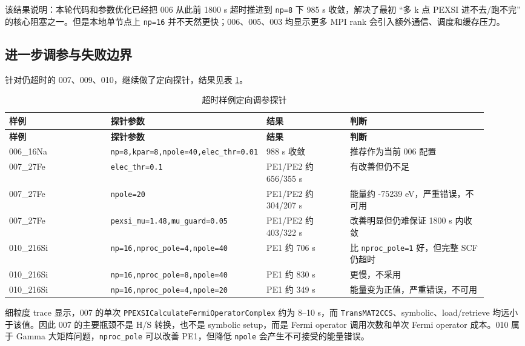 \documentclass[a4paper,11pt]{article}
\newcommand{\code}[1]{\texttt{#1}}
\begin{document}
该结果说明：本轮代码和参数优化已经把 006 从此前 1800 s 超时推进到 \code{np=8} 下 985 s 收敛，解决了最初 ``多 k 点 PEXSI 进不去/跑不完'' 的核心阻塞之一。但是本地单节点上 \code{np=16} 并不天然更快；006、005、003 均显示更多 MPI rank 会引入额外通信、调度和缓存压力。

\subsection{进一步调参与失败边界}

针对仍超时的 007、009、010，继续做了定向探针，结果见表 \ref{tab:timeout-tuning}。

{\scriptsize
\begin{longtable}{@{}p{0.22\linewidth}p{0.22\linewidth}p{0.18\linewidth}p{0.30\linewidth}@{}}
\caption{超时样例定向调参探针}
\label{tab:timeout-tuning}\\
\toprule
\textbf{样例} & \textbf{探针参数} & \textbf{结果} & \textbf{判断}\\
\midrule
\endfirsthead
\toprule
\textbf{样例} & \textbf{探针参数} & \textbf{结果} & \textbf{判断}\\
\midrule
\endhead
006\_16Na & \code{np=8,kpar=8,npole=40,elec\_thr=0.01} & 988 s 收敛 & 推荐作为当前 006 配置\\
007\_27Fe & \code{elec\_thr=0.1} & PE1/PE2 约 656/355 s & 有改善但仍不足\\
007\_27Fe & \code{npole=20} & PE1/PE2 约 304/207 s & 能量约 -75239 eV，严重错误，不可用\\
007\_27Fe & \code{pexsi\_mu=1.48,mu\_guard=0.05} & PE1/PE2 约 403/322 s & 改善明显但仍难保证 1800 s 内收敛\\
010\_216Si & \code{np=16,nproc\_pole=4,npole=40} & PE1 约 706 s & 比 \code{nproc\_pole=1} 好，但完整 SCF 仍超时\\
010\_216Si & \code{np=16,nproc\_pole=8,npole=40} & PE1 约 830 s & 更慢，不采用\\
010\_216Si & \code{np=16,nproc\_pole=4,npole=20} & PE1 约 349 s & 能量变为正值，严重错误，不可用\\
\bottomrule
\end{longtable}
}

细粒度 trace 显示，007 的单次 \code{PPEXSICalculateFermiOperatorComplex} 约为 8--10 s，而 \code{TransMAT2CCS}、symbolic、load/retrieve 均远小于该值。因此 007 的主要瓶颈不是 H/S 转换，也不是 symbolic setup，而是 Fermi operator 调用次数和单次 Fermi operator 成本。010 属于 Gamma 大矩阵问题，\code{nproc\_pole} 可以改善 PE1，但降低 \code{npole} 会产生不可接受的能量错误。
\end{document}
